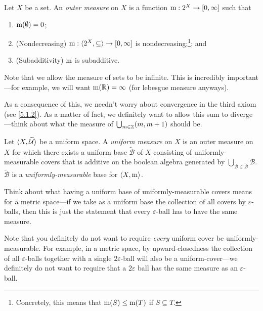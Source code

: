 \begin{dfn}\label{OuterMeasure}
Let $X$ be a set.  An \emph{outer measure} on $X$ is a function $\mathrm{m} :2^X\rightarrow [0,\infty ]$ such that
\begin{enumerate}
\item $\mathrm{m} (\emptyset )=0$;
\item (Nondecreasing)\label{Measure.Monotonicity} $\mathrm{m} :\langle2^X,\subseteq\rangle\rightarrow [0,\infty ]$ is nondecreasing;\footnote{Concretely, this means that $\mathrm{m} (S)\leq \mathrm{m} (T)$ if $S\subseteq T$.}; and
\item (Subadditivity) $\mathrm{m}$ is subadditive.
\end{enumerate}
\begin{rmk}
Note that we allow the measure of sets to be infinite.  This is incredibly important---for example, we will want $\mathrm{m} (\mathbb{R} )=\infty$ (for lebesgue measure anyways).
\end{rmk}
\begin{rmk}
As a consequence of this, we needn't worry about convergence in the third axiom (see \eqref{5.1.2}).  As a matter of fact, we definitely want to allow this sum to diverge---think about what the measure of $\bigcup _{m\in \mathbb{Z}}(m,m+1)$ should be.
\end{rmk}
\end{dfn}
\begin{dfn}\label{Measure}
Let $\langle X,\widetilde{\mathcal{U}}\rangle$ be a uniform space.  A \emph{uniform measure} on $X$ is an outer measure on $X$ for which there exists a uniform base $\widetilde{\mathcal{B}}$ of $X$ consisting of uniformly-measurable covers that is additive on the boolean algebra generated by $\bigcup _{\mathcal{B}\in \widetilde{\mathcal{B}}}\mathcal{B}$.  $\widetilde{\mathcal{B}}$ is a \emph{uniformly-measurable} base for $\langle X,\mathrm{m}\rangle$.
\begin{rmk}
Think about what having a uniform base of uniformly-measurable covers means for a metric space---if we take as a uniform base the collection of all covers by $\varepsilon$-balls, then this is just the statement that every $\varepsilon$-ball has to have the same measure.
\end{rmk}
\begin{rmk}
Note that you definitely do not want to require \emph{every} uniform cover be uniformly-measurable.  For example, in a metric space, by upward-closedness the collection of all $\varepsilon$-balls together with a single $2\varepsilon$-ball will also be a uniform-cover---we definitely do not want to require that a $2\varepsilon$ ball has the same measure as an $\varepsilon$-ball.
\end{rmk}
\end{dfn}
